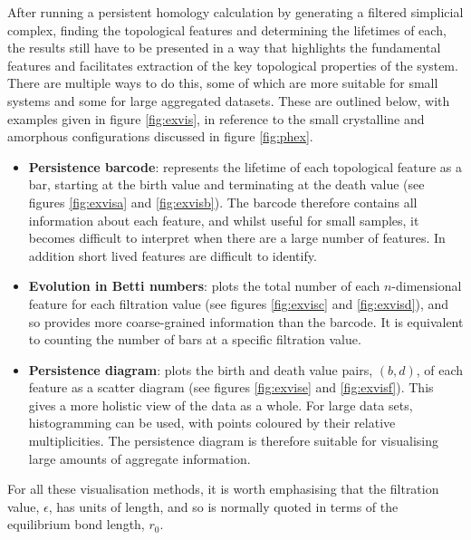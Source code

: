 After running a persistent homology calculation by generating a filtered simplicial complex, finding the topological features and determining the lifetimes of each, the results still have to be presented in a way that highlights the fundamental features and facilitates extraction of the key topological properties of the system.
There are multiple ways to do this, some of which are more suitable for small systems and some for large aggregated datasets.
These are outlined below, with examples given in figure \ref{fig:exvis}, in reference to the small crystalline and amorphous configurations discussed in figure \ref{fig:phex}.
\begin{itemize}
	\item \textbf{Persistence barcode}: represents the lifetime of each topological feature as a bar, starting at the birth value and terminating at the death value (see figures \ref{fig:exvisa} and \ref{fig:exvisb}). The barcode therefore contains all information about each feature, and whilst useful for small samples, it becomes difficult to interpret when there are a large number of features. In addition short lived features are difficult to identify.
	
	\item \textbf{Evolution in Betti numbers}: plots the total number of each $n$\--dimensional feature for each filtration value (see figures \ref{fig:exvisc} and \ref{fig:exvisd}), and so provides more coarse\--grained information than the barcode. It is equivalent to counting the number of bars at a specific filtration value.
	
	\item \textbf{Persistence diagram}: plots the birth and death value pairs, $\left(b,d\right)$, of each feature as a scatter diagram (see figures \ref{fig:exvise} and \ref{fig:exvisf}). This gives a more holistic view of the data as a whole. For large data sets, histogramming can be used, with points coloured by their relative multiplicities. The persistence diagram is therefore suitable for visualising large amounts of aggregate information.
	
\end{itemize}
For all these visualisation methods, it is worth emphasising that the filtration value, $\epsilon$, has units of length, and so is normally quoted in terms of the equilibrium bond length, $r_0$. 


